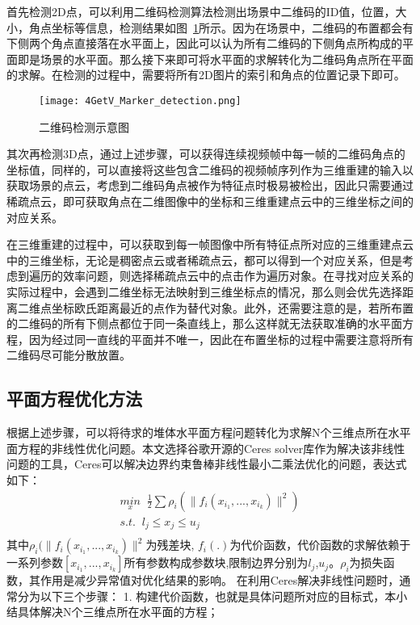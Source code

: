 首先检测2D点，可以利用二维码检测算法检测出场景中二维码的ID值，位置，大小，角点坐标等信息，检测结果如图~\ref{fig:4GetV_Marker_detection}所示。因为在场景中，二维码的布置都会有下侧两个角点直接落在水平面上，因此可以认为所有二维码的下侧角点所构成的平面即是场景的水平面。那么接下来即可将水平面的求解转化为二维码角点所在平面的求解。在检测的过程中，需要将所有2D图片的索引和角点的位置记录下即可。
\begin{figure}[H] %
  \centering
  \texttt{[image: 4GetV\_Marker\_detection.png]}
  \caption{二维码检测示意图}
  \label{fig:4GetV_Marker_detection}
\end{figure}
其次再检测3D点，通过上述步骤，可以获得连续视频帧中每一帧的二维码角点的坐标值，同样的，可以直接将这些包含二维码的视频帧序列作为三维重建的输入以获取场景的点云，考虑到二维码角点被作为特征点时极易被检出，因此只需要通过稀疏点云，即可获取角点在二维图像中的坐标和三维重建点云中的三维坐标之间的对应关系。

在三维重建的过程中，可以获取到每一帧图像中所有特征点所对应的三维重建点云中的三维坐标，无论是稠密点云或者稀疏点云，都可以得到一个对应关系，但是考虑到遍历的效率问题，则选择稀疏点云中的点击作为遍历对象。在寻找对应关系的实际过程中，会遇到二维坐标无法映射到三维坐标点的情况，那么则会优先选择距离二维点坐标欧氏距离最近的点作为替代对象。此外，还需要注意的是，若所布置的二维码的所有下侧点都位于同一条直线上，那么这样就无法获取准确的水平面方程，因为经过同一直线的平面并不唯一，因此在布置坐标的过程中需要注意将所有二维码尽可能分散放置。
\subsection{平面方程优化方法}
\label{sec:4.2.2}
根据上述步骤，可以将待求的堆体水平面方程问题转化为求解N个三维点所在水平面方程的非线性优化问题。本文选择谷歌开源的Ceres solver库作为解决该非线性问题的工具，Ceres可以解决边界约束鲁棒非线性最小二乘法优化的问题，表达式如下：
\begin{equation}
\begin{array}{l}\underset x{min}\;\;\frac12\sum\rho_i(\parallel f_i(x_{i_1},...,x_{i_k})\parallel^2)
\\s.t.\;\;l_j\leq x_j\leq u_j\\\end{array}
\end{equation}
其中$\rho_i(\parallel f_i(x_{i_1},...,x_{i_k})\parallel^2$为残差块, $f_i(.)$为代价函数，代价函数的求解依赖于一系列参数$[x_{i_1},...,x_{i_k}]$所有参数构成参数块,限制边界分别为$l_j$,$u_j$。$\rho_i$为损失函数，其作用是减少异常值对优化结果的影响。
在利用Ceres解决非线性问题时，通常分为以下三个步骤：
1. 构建代价函数，也就是具体问题所对应的目标式，本小结具体解决N个三维点所在水平面的方程；

